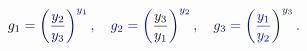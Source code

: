 \documentclass[12pt]{article}
\begin{document}
\makeatletter
\renewcommand*{\@textcolor}[3]{%
  \protect\leavevmode
  \begingroup
    \color#1{#2}#3%
  \endgroup
}
\makeatother
\begin{displaymath}
\mathcolor[RGB]{0,0,15}{g} _ { \mathcolor[RGB]{0,0,30}{1} } \mathcolor[RGB]{0,0,45}{=} \mathcolor[RGB]{0,0,60}{\left(} \mathcolor[RGB]{0,0,75}{\frac { \mathcolor[RGB]{0,0,90}{y} _ { \mathcolor[RGB]{0,0,105}{2} } } { \mathcolor[RGB]{0,0,120}{y} _ { \mathcolor[RGB]{0,0,135}{3} } } } \mathcolor[RGB]{0,0,150}{\right)} ^ { \mathcolor[RGB]{0,0,165}{y} _ { \mathcolor[RGB]{0,0,180}{1} } } \mathcolor[RGB]{0,0,195}{,} \quad \mathcolor[RGB]{0,0,210}{g} _ { \mathcolor[RGB]{0,0,225}{2} } \mathcolor[RGB]{0,0,240}{=} \mathcolor[RGB]{0,0,255}{\left(} \mathcolor[RGB]{0,15,0}{\frac { \mathcolor[RGB]{0,15,15}{y} _ { \mathcolor[RGB]{0,15,30}{3} } } { \mathcolor[RGB]{0,15,45}{y} _ { \mathcolor[RGB]{0,15,60}{1} } } } \mathcolor[RGB]{0,15,75}{\right)} ^ { \mathcolor[RGB]{0,15,90}{y} _ { \mathcolor[RGB]{0,15,105}{2} } } \mathcolor[RGB]{0,15,120}{,} \quad \mathcolor[RGB]{0,15,135}{g} _ { \mathcolor[RGB]{0,15,150}{3} } \mathcolor[RGB]{0,15,165}{=} \mathcolor[RGB]{0,15,180}{\left(} \mathcolor[RGB]{0,15,195}{\frac { \mathcolor[RGB]{0,15,210}{y} _ { \mathcolor[RGB]{0,15,225}{1} } } { \mathcolor[RGB]{0,15,240}{y} _ { \mathcolor[RGB]{0,15,255}{2} } } } \mathcolor[RGB]{0,30,0}{\right)} ^ { \mathcolor[RGB]{0,30,15}{y} _ { \mathcolor[RGB]{0,30,30}{3} } } \mathcolor[RGB]{0,30,45}{.}
\end{displaymath}
\end{document}
